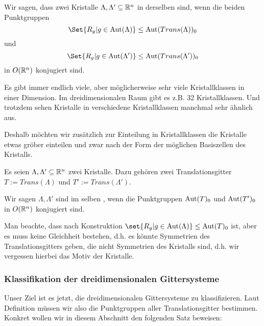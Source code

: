 \begin{definition}[Kristallklassen]
Wir sagen, dass zwei Kristalle $\Lambda,\Lambda'\subseteq\mathbb{R}^n$ in derselben  sind, wenn die beiden Punktgruppen
\[\Set{R_g | g\in\Aut(\Lambda)} \leq \Aut(Trans(\Lambda))_0 \]
und
\[\Set{R_g | g\in\Aut(\Lambda')} \leq \Aut(Trans(\Lambda'))_0 \]
in $O(\mathbb{R}^n)$ konjugiert sind.
\end{definition}

\begin{remark}
Es gibt immer endlich viele, aber möglicherweise sehr viele Kristallklassen in einer Dimension. Im dreidimensionalen Raum gibt es z.B. 32 Kristallklassen. Und trotzdem sehen Kristalle in verschiedene Kristallklassen manchmal sehr ähnlich aus.

Deshalb möchten wir zusätzlich zur Einteilung in Kristallklassen die Kristalle etwas gröber einteilen und zwar nach der Form der möglichen Basiszellen des Kristalls.
\end{remark}

\begin{definition}[Gittersysteme]
Es seien $\Lambda, \Lambda' \subseteq\mathbb{R}^n$ zwei Kristalle. Dazu gehören zwei Translationsgitter $T:=Trans(\Lambda)$ und $T':=Trans(\Lambda')$.

Wir sagen $\Lambda,\Lambda'$ sind im selben , wenn die Punktgruppen $\operatorname{Aut}(T)_0$ und $\operatorname{Aut}(T')_0$ in $O(\mathbb{R}^n)$ konjugiert sind.
\end{definition}

\begin{remark}
Man beachte, dass nach Konstruktion $\set{R_g | g\in \Aut(\Lambda)} \leq \Aut(T)_0$ ist, aber es muss keine Gleichheit bestehen, d.h. es könnte Symmetrien des Translationsgitters geben, die nicht Symmetrien des Kristalls sind, d.h. wir vergessen hierbei das Motiv der Kristalle.
\end{remark}

\subsubsection{Klassifikation der dreidimensionalen Gittersysteme}

\begin{remark}
Unser Ziel ist es jetzt, die dreidimensionalen Gittersysteme zu klassifizieren. Laut Definition müssen wir also die Punktgruppen aller Translationsgitter bestimmen. Konkret wollen wir in diesem Abschnitt den folgenden Satz beweisen:
\end{remark}

